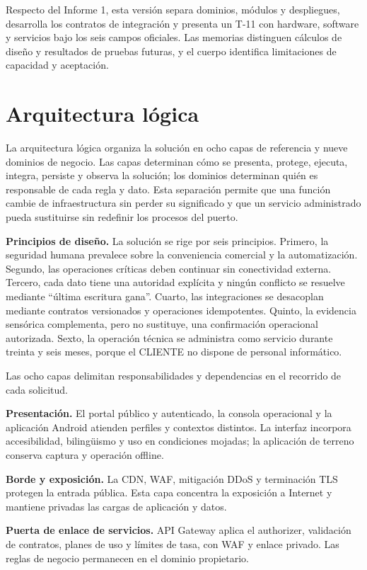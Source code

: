 Respecto del Informe 1, esta versión separa dominios, módulos y despliegues, desarrolla los contratos de integración y presenta un T-11 con hardware, software y servicios bajo los seis campos oficiales. Las memorias distinguen cálculos de diseño y resultados de pruebas futuras, y el cuerpo identifica limitaciones de capacidad y aceptación.

\section{Arquitectura lógica}

La arquitectura lógica organiza la solución en ocho capas de referencia y nueve dominios de negocio. Las capas determinan cómo se presenta, protege, ejecuta, integra, persiste y observa la solución; los dominios determinan quién es responsable de cada regla y dato. Esta separación permite que una función cambie de infraestructura sin perder su significado y que un servicio administrado pueda sustituirse sin redefinir los procesos del puerto.

\textbf{Principios de diseño.} La solución se rige por seis principios. Primero, la seguridad humana prevalece sobre la conveniencia comercial y la automatización. Segundo, las operaciones críticas deben continuar sin conectividad externa. Tercero, cada dato tiene una autoridad explícita y ningún conflicto se resuelve mediante “última escritura gana”. Cuarto, las integraciones se desacoplan mediante contratos versionados y operaciones idempotentes. Quinto, la evidencia sensórica complementa, pero no sustituye, una confirmación operacional autorizada. Sexto, la operación técnica se administra como servicio durante treinta y seis meses, porque el CLIENTE no dispone de personal informático.

Las ocho capas delimitan responsabilidades y dependencias en el recorrido de cada solicitud.

\textbf{Presentación.} El portal público y autenticado, la consola operacional y la aplicación Android atienden perfiles y contextos distintos. La interfaz incorpora accesibilidad, bilingüismo y uso en condiciones mojadas; la aplicación de terreno conserva captura y operación offline.

\textbf{Borde y exposición.} La CDN, WAF, mitigación DDoS y terminación TLS protegen la entrada pública. Esta capa concentra la exposición a Internet y mantiene privadas las cargas de aplicación y datos.

\textbf{Puerta de enlace de servicios.} API Gateway aplica el authorizer, validación de contratos, planes de uso y límites de tasa, con WAF y enlace privado. Las reglas de negocio permanecen en el dominio propietario.

